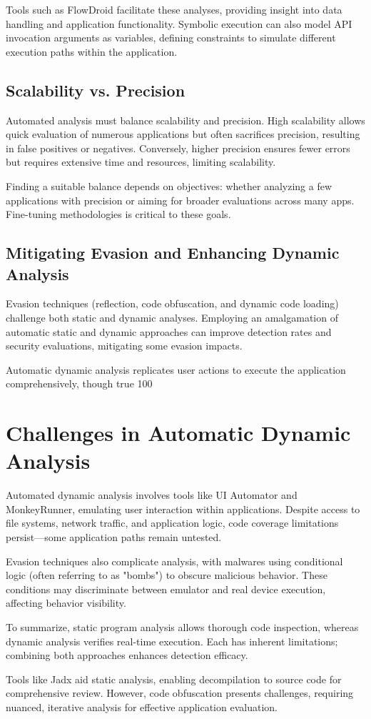\documentclass{article}
\begin{document}
Tools such as FlowDroid facilitate these analyses, providing insight into data handling and application functionality. Symbolic execution can also model API invocation arguments as variables, defining constraints to simulate different execution paths within the application.

\subsection*{Scalability vs. Precision}
Automated analysis must balance scalability and precision. High scalability allows quick evaluation of numerous applications but often sacrifices precision, resulting in false positives or negatives. Conversely, higher precision ensures fewer errors but requires extensive time and resources, limiting scalability.

Finding a suitable balance depends on objectives: whether analyzing a few applications with precision or aiming for broader evaluations across many apps. Fine-tuning methodologies is critical to these goals.

\subsection*{Mitigating Evasion and Enhancing Dynamic Analysis}
Evasion techniques (reflection, code obfuscation, and dynamic code loading) challenge both static and dynamic analyses. Employing an amalgamation of automatic static and dynamic approaches can improve detection rates and security evaluations, mitigating some evasion impacts.

Automatic dynamic analysis replicates user actions to execute the application comprehensively, though true 100%

\section*{Challenges in Automatic Dynamic Analysis}
Automated dynamic analysis involves tools like UI Automator and MonkeyRunner, emulating user interaction within applications. Despite access to file systems, network traffic, and application logic, code coverage limitations persist—some application paths remain untested.

Evasion techniques also complicate analysis, with malwares using conditional logic (often referring to as "bombs") to obscure malicious behavior. These conditions may discriminate between emulator and real device execution, affecting behavior visibility.

To summarize, static program analysis allows thorough code inspection, whereas dynamic analysis verifies real-time execution. Each has inherent limitations; combining both approaches enhances detection efficacy.

Tools like Jadx aid static analysis, enabling decompilation to source code for comprehensive review. However, code obfuscation presents challenges, requiring nuanced, iterative analysis for effective application evaluation.
\end{document}
